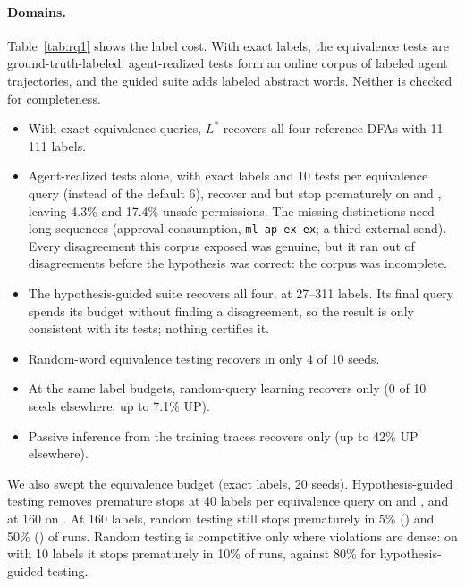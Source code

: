 \paragraph{Domains.}
Table~\ref{tab:rq1} shows the label cost. With exact labels, the equivalence tests are ground-truth-labeled: agent-realized tests
form an online corpus of labeled agent trajectories, and the guided suite adds labeled abstract words. Neither is
checked for completeness. %
\begin{itemize}
  \item With exact equivalence queries, $L^*$ recovers all four reference DFAs with 11--111 labels.
  \item Agent-realized tests alone, with exact labels and 10 tests per equivalence query (instead of the default 6), recover  and
   but stop prematurely on  and , leaving 4.3\% and 17.4\% unsafe
  permissions. The missing distinctions need long sequences (approval consumption, \texttt{ml\,ap\,ex\,ex}; a third
  external send). Every disagreement this corpus exposed was genuine, but it ran out of disagreements before the hypothesis was correct:
  the corpus was incomplete.
  \item The hypothesis-guided suite recovers all four, at 27--311 labels. Its final query spends its budget without finding
  a disagreement, so the result is only consistent with its tests; nothing certifies it.
  \item Random-word equivalence testing recovers  in only 4 of 10 seeds.
  \item At the same label budgets, random-query learning recovers only  (0 of 10 seeds elsewhere, up to
  7.1\% UP).
  \item Passive inference from the training traces recovers only  (up to 42\% UP elsewhere).
\end{itemize}

We also swept the equivalence budget (exact labels, 20 seeds). Hypothesis-guided testing removes premature stops at 40 labels
per equivalence query on  and , and at 160 on . At 160 labels, random
testing still stops prematurely in 5\% () and 50\% () of runs. Random testing is
competitive only where violations are dense: on  with 10 labels it stops prematurely in 10\% of runs, against
80\% for hypothesis-guided testing.

